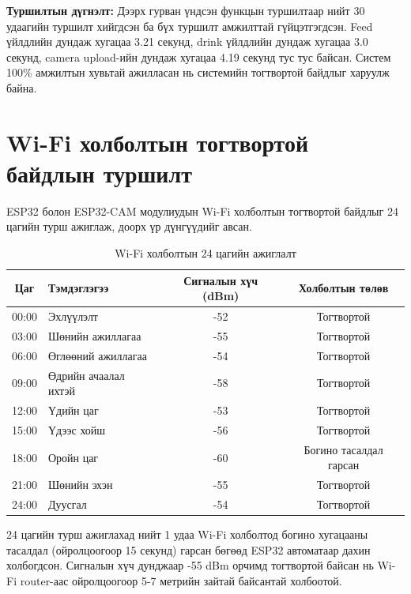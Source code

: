 \documentclass[12pt,a4paper]{report}
\begin{document}
\textbf{Туршилтын дүгнэлт:} Дээрх гурван үндсэн функцын туршилтаар нийт 30 удаагийн туршилт хийгдсэн ба бүх туршилт амжилттай гүйцэтгэгдсэн. Feed үйлдлийн дундаж хугацаа 3.21 секунд, drink үйлдлийн дундаж хугацаа 3.0 секунд, camera upload-ийн дундаж хугацаа 4.19 секунд тус тус байсан. Систем 100\% амжилтын хувьтай ажилласан нь системийн тогтвортой байдлыг харуулж байна.

\section{Wi-Fi холболтын тогтвортой байдлын туршилт}

ESP32 болон ESP32-CAM модулиудын Wi-Fi холболтын тогтвортой байдлыг 24 цагийн турш ажиглаж, доорх үр дүнгүүдийг авсан.

\begin{table}[H]
\centering
\scriptsize
\caption{Wi-Fi холболтын 24 цагийн ажиглалт}
\label{tab:wifi-test}
\begin{tabularx}{\textwidth}{|c|X|c|c|}
\hline
\textbf{Цаг} & \textbf{Тэмдэглэгээ} & \textbf{Сигналын хүч (dBm)} & \textbf{Холболтын төлөв} \\ \hline
00:00 & Эхлүүлэлт              & -52 & Тогтвортой \\ \hline
03:00 & Шөнийн ажиллагаа       & -55 & Тогтвортой \\ \hline
06:00 & Өглөөний ажиллагаа     & -54 & Тогтвортой \\ \hline
09:00 & Өдрийн ачаалал ихтэй   & -58 & Тогтвортой \\ \hline
12:00 & Үдийн цаг              & -53 & Тогтвортой \\ \hline
15:00 & Үдээс хойш             & -56 & Тогтвортой \\ \hline
18:00 & Оройн цаг              & -60 & Богино тасалдал гарсан \\ \hline
21:00 & Шөнийн эхэн            & -55 & Тогтвортой \\ \hline
24:00 & Дуусгал                & -54 & Тогтвортой \\ \hline
\end{tabularx}
\end{table}

24 цагийн турш ажиглахад нийт 1 удаа Wi-Fi холболтод богино хугацааны тасалдал (ойролцоогоор 15 секунд) гарсан бөгөөд ESP32 автоматаар дахин холбогдсон. Сигналын хүч дунджаар -55 dBm орчимд тогтвортой байсан нь Wi-Fi router-аас ойролцоогоор 5-7 метрийн зайтай байсантай холбоотой.
\end{document}

